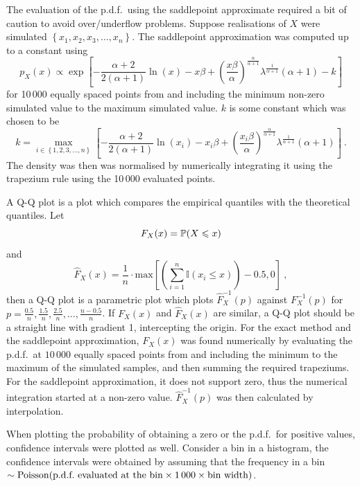 The evaluation of the p.d.f.~using the saddlepoint approximate required a bit of caution to avoid over/underflow problems. Suppose realisations of $X$ were simulated $\left\{x_1,x_2,x_3,\dotsc,x_n\right\}$. The saddlepoint approximation was computed up to a constant using
\begin{equation}
  p_X(x) \propto
  \exp\left[
    -\frac{\alpha+2}{2(\alpha+1)}
    \ln(x)
    -x\beta
    +\left(
    \frac{x\beta}{\alpha}
    \right)^{\frac{\alpha}{\alpha+1}}\lambda^{\frac{1}{\alpha+1}}(\alpha+1) - k
  \right]
\end{equation}
for 10\,000 equally spaced points from and including the minimum non-zero simulated value to the maximum simulated value. $k$ is some constant which was chosen to be
\begin{equation}
  k =
  \max_{i\in\left\{1,2,3,\dotsc,n\right\}}
  \left[
    -\frac{\alpha+2}{2(\alpha+1)}
    \ln(x_i)
    -x_i\beta
    +\left(
      \frac{x_i\beta}{\alpha}
    \right)^{\frac{\alpha}{\alpha+1}}\lambda^{\frac{1}{\alpha+1}}(\alpha+1)
  \right]
  \ .
\end{equation}
The density was then was normalised by numerically integrating it using the trapezium rule using the 10\,000 evaluated points.

A Q-Q plot is a plot which compares the empirical quantiles with the theoretical quantiles. Let
\begin{equation}
  F_X(x) = \operatorname{\mathbb{P}}(X\leqslant x)
\end{equation}
and
\begin{equation}
  \widehat{F}_X(x) = \frac{1}{n}\cdot\text{max}
  \left[
    \left(\sum_{i=1}^n\mathbb{I}(x_i\leqslant x)\right)-0.5,0
  \right]
  \ ,
\end{equation}
then a Q-Q plot is a parametric plot which plots $\widehat{F}_X^{-1}(p)$ against $F_X^{-1}(p)$ for $p=\frac{0.5}{n},\frac{1.5}{n},\frac{2.5}{n},\dotsc,\frac{n-0.5}{n}$. If $F_X(x)$ and $\widehat{F}_X(x)$ are similar, a Q-Q plot should be a straight line with gradient 1, intercepting the origin. For the exact method and the saddlepoint approximation, $F_X(x)$ was found numerically by evaluating the p.d.f.~at $10\,000$ equally spaced points from and including the minimum to the maximum of the simulated samples, and then summing the required trapeziums. For the saddlepoint approximation, it does not support zero, thus the numerical integration started at a non-zero value. $\widehat{F}_X^{-1}(p)$ was then calculated by interpolation.

When plotting the probability of obtaining a zero or the p.d.f.~for positive values, confidence intervals were plotted as well. Consider a bin in a histogram, the confidence intervals were obtained by assuming that the frequency in a bin $\sim\operatorname{Poisson}(\text{p.d.f.~evaluated at the bin}\times 1\,000 \times \text{bin width})$.

